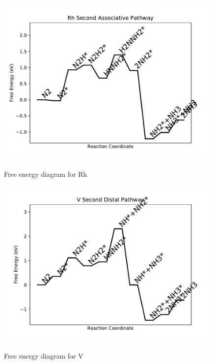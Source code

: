 \documentclass{article}
\begin{document}
\newpage
\begin{figure}
\includegraphics[width=1\linewidth]{data/plots/Rh_associative_2.pdf}
\label{fig:Rh_associative_2}
\caption{Free energy diagram for Rh}
\end{figure}

\begin{figure}
\includegraphics[width=1\linewidth]{data/plots/V_distal_2.pdf}
\label{fig:V_distal_2}
\caption{Free energy diagram for V}
\end{figure}
\end{document}
